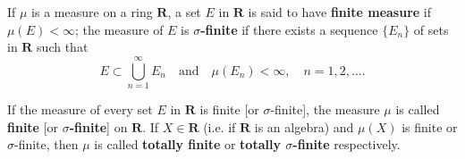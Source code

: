 If $\mu$ is a measure on a ring $\mathbf{R}$, a set $E$ in $\mathbf{R}$ is said to have \textbf{finite measure} if $\mu(E) < \infty$; the measure of $E$ is \textbf{$\sigma$-finite} if there exists a sequence $\{E_n\}$ of sets in $\mathbf{R}$ such that
$$E \subset \bigcup_{n=1}^{\infty} E_n \quad \text{and} \quad \mu(E_n) < \infty, \quad n = 1, 2, \dots.$$

If the measure of every set $E$ in $\mathbf{R}$ is finite [or $\sigma$-finite], the measure $\mu$ is called \textbf{finite} [or \textbf{$\sigma$-finite}] on $\mathbf{R}$. If $X \in \mathbf{R}$ (i.e. if $\mathbf{R}$ is an algebra) and $\mu(X)$ is finite or $\sigma$-finite, then $\mu$ is called \textbf{totally finite} or \textbf{totally $\sigma$-finite} respectively.
